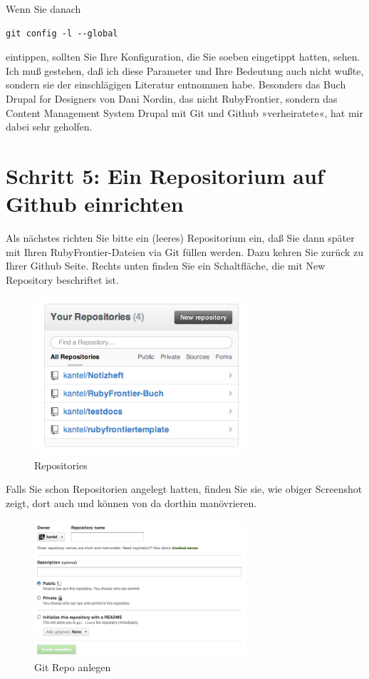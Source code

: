 \documentclass[11pt]{report}
\begin{document}
Wenn Sie danach


\begin{verbatim}
git config -l --global
\end{verbatim}

eintippen, sollten Sie Ihre Konfiguration, die Sie soeben eingetippt
hatten, sehen. Ich muß gestehen, daß ich diese Parameter und Ihre
Bedeutung auch nicht wußte, sondern sie der einschlägigen Literatur
entnommen habe. Besonders das Buch Drupal for Designers von Dani
Nordin, das nicht RubyFrontier, sondern das Content Management System
Drupal mit Git und Github »verheiratete«, hat mir dabei sehr geholfen.
\section{Schritt 5: Ein Repositorium auf Github einrichten}
\label{sec-2-11-5}


Als nächstes richten Sie bitte ein (leeres) Repositorium ein, daß Sie
dann später mit Ihren RubyFrontier-Dateien via Git füllen werden. Dazu
kehren Sie zurück zu Ihrer Github Seite. Rechts unten finden Sie ein
Schaltfläche, die mit New Repository beschriftet ist.

\begin{figure}[h!]
\centering
\includegraphics[width=0.7\textwidth]{./images/new-repository.png}
\caption{\label{new-repository}Repositories}
\end{figure}

Falls Sie schon Repositorien angelegt hatten, finden Sie sie, wie
obiger Screenshot zeigt, dort auch und können von da dorthin
manövrieren.

\begin{figure}[h!]
\centering
\includegraphics[width=0.7\textwidth]{./images/git-repo-anlegen.png}
\caption{\label{git-repo-anlegen}Git Repo anlegen}
\end{figure}
\end{document}
